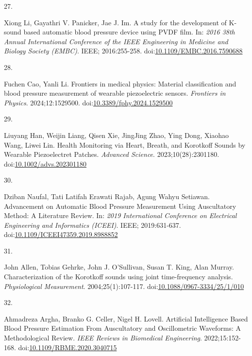 \documentclass[
  12pt,
  letterpaper,
  openany,
  oneside]{book}
\newlength{\cslhangindent}
\newlength{\csllabelwidth}
\newenvironment{CSLReferences}[2] %
 {\begin{list}{}{%
  \setlength{\itemindent}{0pt}
  \setlength{\leftmargin}{0pt}
  \setlength{\parsep}{0pt}
  \ifodd #1
   \setlength{\leftmargin}{\cslhangindent}
   \setlength{\itemindent}{-1\cslhangindent}
  \fi
  \setlength{\itemsep}{#2\baselineskip}}}
 {\end{list}}
\newcommand{\CSLLeftMargin}[1]{\parbox[t]{\csllabelwidth}{\strut#1\strut}}
\newcommand{\CSLRightInline}[1]{\parbox[t]{\linewidth - \csllabelwidth}{\strut#1\strut}}
\begin{document}
\begin{CSLReferences}{0}{1}
\CSLLeftMargin{27. }%
\CSLRightInline{Xiong Li, Gayathri V. Panicker, Jae J. Im. A study for
the development of {K}-sound based automatic blood pressure device using
{PVDF} film. In: \emph{2016 38th {Annual} {International} {Conference}
of the {IEEE} {Engineering} in {Medicine} and {Biology} {Society}
({EMBC})}. IEEE; 2016:255-258.
doi:\href{https://doi.org/10.1109/EMBC.2016.7590688}{10.1109/EMBC.2016.7590688}}

\CSLLeftMargin{28. }%
\CSLRightInline{Fuchen Cao, Yanli Li. Frontiers in medical physics:
Material classification and blood pressure measurement of wearable
piezoelectric sensors. \emph{Frontiers in Physics}. 2024;12:1529500.
doi:\href{https://doi.org/10.3389/fphy.2024.1529500}{10.3389/fphy.2024.1529500}}

\CSLLeftMargin{29. }%
\CSLRightInline{Liuyang Han, Weijin Liang, Qisen Xie, JingJing Zhao,
Ying Dong, Xiaohao Wang, Liwei Lin. Health {Monitoring} via {Heart},
{Breath}, and {Korotkoff} {Sounds} by {Wearable} {Piezoelectret}
{Patches}. \emph{Advanced Science}. 2023;10(28):2301180.
doi:\href{https://doi.org/10.1002/advs.202301180}{10.1002/advs.202301180}}

\CSLLeftMargin{30. }%
\CSLRightInline{Dziban Naufal, Tati Latifah Erawati Rajab, Agung Wahyu
Setiawan. Advancement on {Automatic} {Blood} {Pressure} {Measurement}
{Using} {Auscultatory} {Method}: {A} {Literature} {Review}. In:
\emph{2019 {International} {Conference} on {Electrical} {Engineering}
and {Informatics} ({ICEEI})}. IEEE; 2019:631-637.
doi:\href{https://doi.org/10.1109/ICEEI47359.2019.8988852}{10.1109/ICEEI47359.2019.8988852}}

\CSLLeftMargin{31. }%
\CSLRightInline{John Allen, Tobias Gehrke, John J. O'Sullivan, Susan T.
King, Alan Murray. Characterization of the {Korotkoff} sounds using
joint time-frequency analysis. \emph{Physiological Measurement}.
2004;25(1):107-117.
doi:\href{https://doi.org/10.1088/0967-3334/25/1/010}{10.1088/0967-3334/25/1/010}}

\CSLLeftMargin{32. }%
\CSLRightInline{Ahmadreza Argha, Branko G. Celler, Nigel H. Lovell.
Artificial {Intelligence} {Based} {Blood} {Pressure} {Estimation} {From}
{Auscultatory} and {Oscillometric} {Waveforms}: {A} {Methodological}
{Review}. \emph{IEEE Reviews in Biomedical Engineering}.
2022;15:152-168.
doi:\href{https://doi.org/10.1109/RBME.2020.3040715}{10.1109/RBME.2020.3040715}}


\end{CSLReferences}
\end{document}
